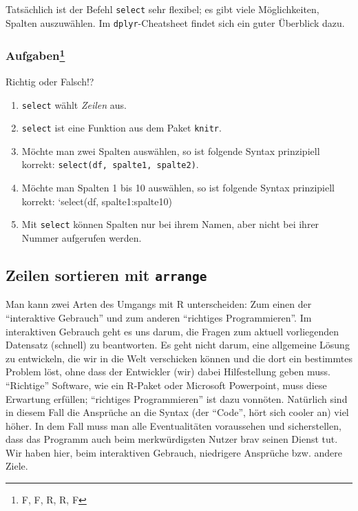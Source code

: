 \documentclass[12pt,ngerman,]{book}
\providecommand{\tightlist}{%
  \setlength{\itemsep}{0pt}\setlength{\parskip}{0pt}}
\let\rmarkdownfootnote\footnote%
\def\footnote{\protect\rmarkdownfootnote}
\let\BeginKnitrBlock\begin \let\EndKnitrBlock\end
\begin{document}
Tatsächlich ist der Befehl \texttt{select} sehr flexibel; es gibt viele
Möglichkeiten, Spalten auszuwählen. Im \texttt{dplyr}-Cheatsheet findet
sich ein guter Überblick dazu.

\subsubsection[Aufgaben]{\texorpdfstring{Aufgaben\footnote{F, F, R, R, F}}{Aufgaben}}\label{aufgaben-4}

\BeginKnitrBlock{rmdexercises}
Richtig oder Falsch!?

\begin{enumerate}
\def\labelenumi{\arabic{enumi}.}
\tightlist
\item
  \texttt{select} wählt \emph{Zeilen} aus.
\item
  \texttt{select} ist eine Funktion aus dem Paket \texttt{knitr}.
\item
  Möchte man zwei Spalten auswählen, so ist folgende Syntax prinzipiell
  korrekt: \texttt{select(df,\ spalte1,\ spalte2)}.
\item
  Möchte man Spalten 1 bis 10 auswählen, so ist folgende Syntax
  prinzipiell korrekt: `select(df, spalte1:spalte10)
\item
  Mit \texttt{select} können Spalten nur bei ihrem Namen, aber nicht bei
  ihrer Nummer aufgerufen werden.
\end{enumerate}
\EndKnitrBlock{rmdexercises}

\subsection{\texorpdfstring{Zeilen sortieren mit
\texttt{arrange}}{Zeilen sortieren mit arrange}}\label{zeilen-sortieren-mit-arrange}

Man kann zwei Arten des Umgangs mit R unterscheiden: Zum einen der
``interaktive Gebrauch'' und zum anderen ``richtiges Programmieren''. Im
interaktiven Gebrauch geht es uns darum, die Fragen zum aktuell
vorliegenden Datensatz (schnell) zu beantworten. Es geht nicht darum,
eine allgemeine Lösung zu entwickeln, die wir in die Welt verschicken
können und die dort ein bestimmtes Problem löst, ohne dass der
Entwickler (wir) dabei Hilfestellung geben muss. ``Richtige'' Software,
wie ein R-Paket oder Microsoft Powerpoint, muss diese Erwartung
erfüllen; ``richtiges Programmieren'' ist dazu vonnöten. Natürlich sind
in diesem Fall die Ansprüche an die Syntax (der ``Code'', hört sich
cooler an) viel höher. In dem Fall muss man alle Eventualitäten
voraussehen und sicherstellen, dass das Programm auch beim
merkwürdigsten Nutzer brav seinen Dienst tut. Wir haben hier, beim
interaktiven Gebrauch, niedrigere Ansprüche bzw. andere Ziele.
\end{document}
